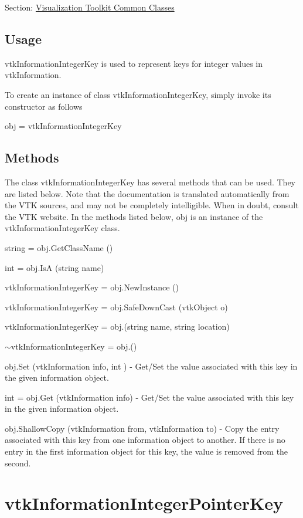 Section\-: \hyperlink{sec_vtkcommon}{Visualization Toolkit Common Classes} \hypertarget{vtkwidgets_vtkxyplotwidget_Usage}{}\subsection{Usage}\label{vtkwidgets_vtkxyplotwidget_Usage}
vtk\-Information\-Integer\-Key is used to represent keys for integer values in vtk\-Information.

To create an instance of class vtk\-Information\-Integer\-Key, simply invoke its constructor as follows \begin{DoxyVerb}  obj = vtkInformationIntegerKey
\end{DoxyVerb}
 \hypertarget{vtkwidgets_vtkxyplotwidget_Methods}{}\subsection{Methods}\label{vtkwidgets_vtkxyplotwidget_Methods}
The class vtk\-Information\-Integer\-Key has several methods that can be used. They are listed below. Note that the documentation is translated automatically from the V\-T\-K sources, and may not be completely intelligible. When in doubt, consult the V\-T\-K website. In the methods listed below, {\ttfamily obj} is an instance of the vtk\-Information\-Integer\-Key class. 
\begin{DoxyItemize}
\item {\ttfamily string = obj.\-Get\-Class\-Name ()}  
\item {\ttfamily int = obj.\-Is\-A (string name)}  
\item {\ttfamily vtk\-Information\-Integer\-Key = obj.\-New\-Instance ()}  
\item {\ttfamily vtk\-Information\-Integer\-Key = obj.\-Safe\-Down\-Cast (vtk\-Object o)}  
\item {\ttfamily vtk\-Information\-Integer\-Key = obj.(string name, string location)}  
\item {\ttfamily $\sim$vtk\-Information\-Integer\-Key = obj.()}  
\item {\ttfamily obj.\-Set (vtk\-Information info, int )} -\/ Get/\-Set the value associated with this key in the given information object.  
\item {\ttfamily int = obj.\-Get (vtk\-Information info)} -\/ Get/\-Set the value associated with this key in the given information object.  
\item {\ttfamily obj.\-Shallow\-Copy (vtk\-Information from, vtk\-Information to)} -\/ Copy the entry associated with this key from one information object to another. If there is no entry in the first information object for this key, the value is removed from the second.  
\end{DoxyItemize}\hypertarget{vtkcommon_vtkinformationintegerpointerkey}{}\section{vtk\-Information\-Integer\-Pointer\-Key}\label{vtkcommon_vtkinformationintegerpointerkey}
